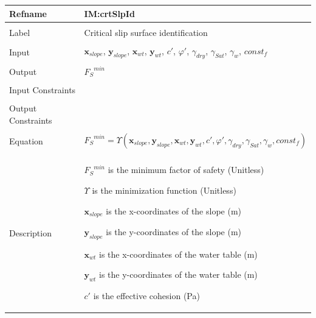 \documentclass[12pt]{article}
\begin{document}
\noindent \begin{minipage}{\textwidth}
          \begin{tabular}{>{\raggedright}p{}>{\raggedright\arraybackslash}p{}}
          \toprule \textbf{Refname} & \textbf{IM:crtSlpId}
          \label{IM:crtSlpId}
          \\ \midrule \\
          Label & Critical slip surface identification
          \\ \midrule \\
          Input & ${\mathbf{x}_{slope}}$, ${\mathbf{y}_{slope}}$, ${\mathbf{x}_{wt}}$, ${\mathbf{y}_{wt}}$, $c'$, $φ'$, ${γ_{dry}}$, ${γ_{Sat}}$, ${γ_{w}}$, $const_f$
          \\ \midrule \\
          Output & ${{F_{S}}^{min}}$
          \\ \midrule \\
          Input Constraints & 
          \\ \midrule \\
          Output Constraints & 
          \\ \midrule \\
          Equation & \begin{displaymath}
                     {{F_{S}}^{min}}=Υ\left({\mathbf{x}_{slope}},{\mathbf{y}_{slope}},{\mathbf{x}_{wt}},{\mathbf{y}_{wt}},c',φ',{γ_{dry}},{γ_{Sat}},{γ_{w}},const_f\right)
                     \end{displaymath}
          \\ \midrule \\
          Description & \begin{symbDescription}
                        \item{${{F_{S}}^{min}}$ is the minimum factor of safety (Unitless)}
                        \item{$Υ$ is the minimization function (Unitless)}
                        \item{${\mathbf{x}_{slope}}$ is the x-coordinates of the slope (m)}
                        \item{${\mathbf{y}_{slope}}$ is the y-coordinates of the slope (m)}
                        \item{${\mathbf{x}_{wt}}$ is the x-coordinates of the water table (m)}
                        \item{${\mathbf{y}_{wt}}$ is the y-coordinates of the water table (m)}
                        \item{$c'$ is the effective cohesion (Pa)}

\end{symbDescription}
\end{tabular}
\end{minipage}
\end{document}
